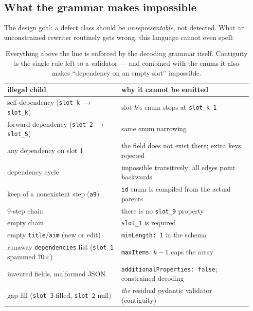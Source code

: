 \documentclass[11pt]{article}
\begin{document}
\subsection{What the grammar makes impossible}
The design goal: a defect class should be \emph{unrepresentable}, not detected. What an
unconstrained rewriter routinely gets wrong, this language cannot even spell:
\begin{table}[H]\centering\small
\begin{tabular}{ll}
\toprule
illegal child & why it cannot be emitted \\
\midrule
self-dependency (\texttt{slot\_k} $\to$ \texttt{slot\_k}) & slot $k$'s enum stops at \texttt{slot\_{k-1}} \\
forward dependency (\texttt{slot\_2} $\to$ \texttt{slot\_5}) & same enum narrowing \\
any dependency on slot 1 & the field does not exist there; extra keys rejected \\
dependency cycle & impossible transitively: all edges point backwards \\
keep of a nonexistent step (\texttt{a9}) & \texttt{id} enum is compiled from the actual parents \\
9-step chain & there is no \texttt{slot\_9} property \\
empty chain & \texttt{slot\_1} is required \\
empty \texttt{title}/\texttt{aim} (new or edit) & \texttt{minLength: 1} in the schema \\
runaway \texttt{dependencies} list (\texttt{slot\_1} spammed 70$\times$) & \texttt{maxItems}: $k-1$ caps the array \\
invented fields, malformed JSON & \texttt{additionalProperties: false}; constrained decoding \\
\midrule
gap fill (\texttt{slot\_3} filled, \texttt{slot\_2} null) & \emph{the} residual pydantic validator (contiguity) \\
\bottomrule
\end{tabular}
\caption{Everything above the line is enforced by the decoding grammar itself. Contiguity is
the single rule left to a validator --- and combined with the enums it also makes
``dependency on an empty slot'' impossible.}
\end{table}
\end{document}
